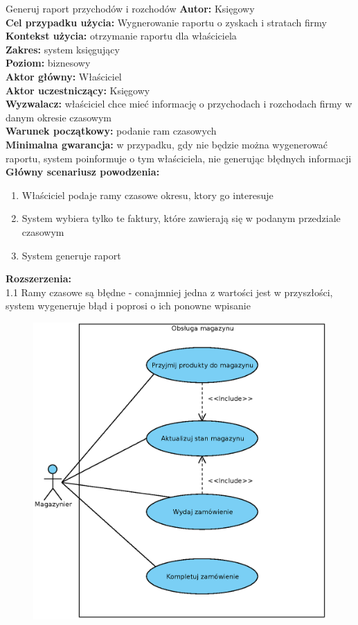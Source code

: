 \begin{usecase}{Generuj raport przychodów i rozchodów}
	\textbf{Autor:} Księgowy\\
	\textbf{Cel przypadku użycia:} Wygnerowanie raportu o zyskach i stratach firmy \\
	\textbf{Kontekst użycia:} otrzymanie raportu dla właściciela  \\
	\textbf{Zakres:} system księgujący \\
	\textbf{Poziom:} biznesowy \\
	\textbf{Aktor główny:} Właściciel \\
	\textbf{Aktor uczestniczący:} Księgowy \\
	\textbf{Wyzwalacz:} właściciel chce mieć informację o przychodach i rozchodach firmy w danym okresie czasowym \\
	\textbf{Warunek początkowy:} podanie ram czasowych  \\
	\textbf{Minimalna gwarancja:} w przypadku, gdy nie będzie można wygenerować raportu, system poinformuje o tym właściciela, nie generując błędnych informacji \\
	\textbf{Główny scenariusz powodzenia:} 
		\begin{enumerate}
			\item Właściciel podaje ramy czasowe okresu, ktory go interesuje
			\item System wybiera tylko te faktury, które zawierają się w podanym przedziale czasowym
			\item System generuje raport
		\end{enumerate}
	\textbf{Rozszerzenia:} \\
	1.1 Ramy czasowe są błędne - conajmniej jedna z wartości jest w przyszłości, system wygeneruje błąd i poprosi o ich ponowne wpisanie
\end{usecase}

\begin{figure}[H]
	\centering
	\includegraphics[width=.8\textwidth]{img/UC/magazyn.eps}
\end{figure}

